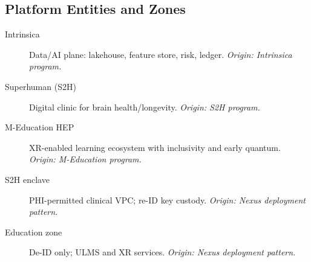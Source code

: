 \documentclass[11pt]{article}
\theoremstyle{plain}
\begin{document}
\subsection*{Platform Entities and Zones}
\begin{description}
  \item[Intrinsica] Data/AI plane: lakehouse, feature store, risk, ledger. \emph{Origin: Intrinsica program.}
  \item[Superhuman (S2H)] Digital clinic for brain health/longevity. \emph{Origin: S2H program.}
  \item[M-Education HEP] XR-enabled learning ecosystem with inclusivity and early quantum. \emph{Origin: M-Education program.}
  \item[S2H enclave] PHI-permitted clinical VPC; re-ID key custody. \emph{Origin: Nexus deployment pattern.}
  \item[Education zone] De-ID only; ULMS and XR services. \emph{Origin: Nexus deployment pattern.}
\end{description}



\nocite{*}


\end{document}
